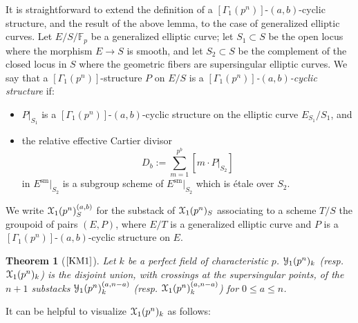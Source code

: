 \documentclass[11pt]{amsart}
\newtheorem{theorem}[subsection]{Theorem}
\theoremstyle{definition}
\begin{document}
It is straightforward to extend the definition of a $[\Gamma_1(p^n)]$-$(a,b)$-cyclic structure, and the result of the above lemma, to the case of generalized elliptic curves. Let $E/S/\mathbb{F}_p$ be a generalized elliptic curve; let $S_1 \subset S$ be the open locus where the morphism $E \rightarrow S$ is smooth, and let $S_2 \subset S$ be the complement of the closed locus in $S$ where the geometric fibers are supersingular elliptic curves. We say that a $[\Gamma_1(p^n)]$-structure $P$ on $E/S$ is a \textit{$[\Gamma_1(p^n)]$-$(a,b)$-cyclic structure} if:
\begin{itemize}
  \item $P|_{S_1}$ is a $[\Gamma_1(p^n)]$-$(a,b)$-cyclic structure on the elliptic curve $E_{S_1}/S_1$, and 
  \item the relative effective Cartier divisor 
  \begin{displaymath}
  D_b := \sum_{m = 1}^{p^b} [m\cdot P|_{S_2}]
  \end{displaymath}
  in $E^{\mathrm{sm}}|_{S_2}$ is a subgroup scheme of $E^{\mathrm{sm}}|_{S_2}$ which is \'etale over $S_2$.
\end{itemize}
We write ${\mathbf{\EuScript{X}}}_1(p^n)^{(a,b)}_S$ for the substack of ${\mathbf{\EuScript{X}}}_1(p^n)_S$ associating to a scheme $T/S$ the groupoid of pairs $(E,P)$, where $E/T$ is a generalized elliptic curve and $P$ is a $[\Gamma_1(p^n)]$-$(a,b)$-cyclic structure on $E$.

\begin{theorem}[$\textrm{\cite[13.5.4]{KM1}}$]\label{y1-char-p}
Let $k$ be a perfect field of characteristic $p$. ${\mathbf{\EuScript{Y}}}_1(p^n)_k$ (resp. ${\mathbf{\EuScript{X}}}_1(p^n)_k$) is the disjoint union, with crossings at the supersingular points, of the $n+1$ substacks ${\mathbf{\EuScript{Y}}}_1(p^n)^{(a,n-a)}_k$ (resp. ${\mathbf{\EuScript{X}}}_1(p^n)^{(a,n-a)}_k$) for $0 \leq a \leq n$.
\end{theorem}

It can be helpful to visualize ${\mathbf{\EuScript{X}}}_1(p^n)_k$ as follows:

\begin{center}
\end{center}
\end{document}

